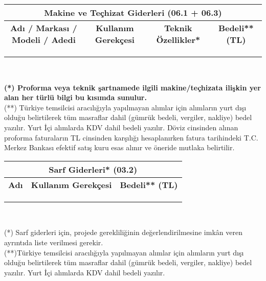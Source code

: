 \begin{center}
    
\begin{tabular}{|c|c|c|c|}
\hline
\multicolumn{4}{|c|}{\textbf{Makine ve Teçhizat Giderleri (06.1 + 06.3)}} \\ \hline
\footnotesize
\textbf{Adı / Markası / Modeli / Adedi} & 
\footnotesize
\textbf{Kullanım Gerekçesi} & 
\footnotesize
\textbf{Teknik Özellikler*} & 
\footnotesize
\textbf{Bedeli** (TL)} \\ \hline
 &  &  &  \\ \hline
 &  &  &  \\ \hline
 &  &  &  \\ \hline
 
\end{tabular} \\%
\end{center}
{\footnotesize 
\textbf{(*) Proforma veya teknik şartnamede ilgili makine/teçhizata ilişkin yer alan her türlü bilgi bu kısımda sunulur.} \\
(**) Türkiye temsilcisi aracılığıyla yapılmayan alımlar için alımların yurt dışı olduğu belirtilerek tüm masraflar dahil (gümrük bedeli, vergiler, nakliye) bedel yazılır. Yurt İçi alımlarda KDV dahil bedeli yazılır. Döviz cinsinden alınan proforma faturaların TL cinsinden karşılığı hesaplanırken fatura tarihindeki T.C. Merkez Bankası efektif satış kuru esas alınır ve öneride mutlaka belirtilir.
}


\begin{center}
\begin{tabular}{|c|c|c|}
\hline
\multicolumn{3}{|c|}{\textbf{Sarf Giderleri* (03.2)}} \\ \hline
\footnotesize
\textbf{Adı} & 
\footnotesize
\textbf{Kullanım Gerekçesi} & 
\footnotesize
\textbf{Bedeli** (TL)} \\ \hline
 &  &  \\ \hline
 &  &  \\ \hline
 &  &  \\ \hline
\end{tabular} \\ %
\end{center}
{\footnotesize
 (*) Sarf giderleri için, projede gerekliliğinin değerlendirilmesine imkân veren ayrıntıda liste verilmesi gerekir.\\
 (**)Türkiye temsilcisi aracılığıyla yapılmayan alımlar için alımların yurt dışı olduğu belirtilerek tüm masraflar dahil (gümrük bedeli, vergiler, nakliye) bedel yazılır. Yurt İçi alımlarda KDV dahil bedeli yazılır.
 }

